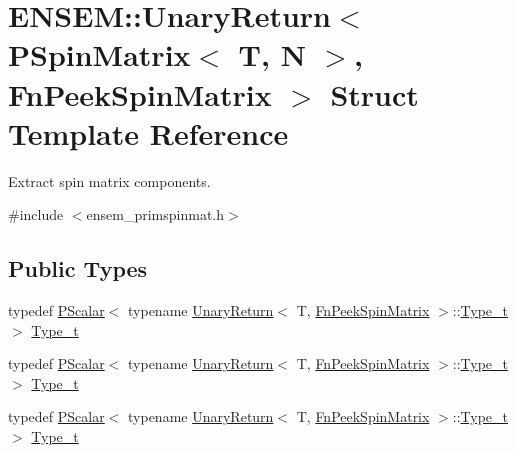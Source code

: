 \hypertarget{structENSEM_1_1UnaryReturn_3_01PSpinMatrix_3_01T_00_01N_01_4_00_01FnPeekSpinMatrix_01_4}{}\section{E\+N\+S\+EM\+:\+:Unary\+Return$<$ P\+Spin\+Matrix$<$ T, N $>$, Fn\+Peek\+Spin\+Matrix $>$ Struct Template Reference}
\label{structENSEM_1_1UnaryReturn_3_01PSpinMatrix_3_01T_00_01N_01_4_00_01FnPeekSpinMatrix_01_4}


Extract spin matrix components.  




{\ttfamily \#include $<$ensem\+\_\+primspinmat.\+h$>$}

\subsection*{Public Types}
\begin{DoxyCompactItemize}
\item 
typedef \mbox{\hyperlink{classENSEM_1_1PScalar}{P\+Scalar}}$<$ typename \mbox{\hyperlink{structENSEM_1_1UnaryReturn}{Unary\+Return}}$<$ T, \mbox{\hyperlink{structENSEM_1_1FnPeekSpinMatrix}{Fn\+Peek\+Spin\+Matrix}} $>$\+::\mbox{\hyperlink{structENSEM_1_1UnaryReturn_3_01PSpinMatrix_3_01T_00_01N_01_4_00_01FnPeekSpinMatrix_01_4_a1a718fe587d03e5619b75af54e2a19a3}{Type\+\_\+t}} $>$ \mbox{\hyperlink{structENSEM_1_1UnaryReturn_3_01PSpinMatrix_3_01T_00_01N_01_4_00_01FnPeekSpinMatrix_01_4_a1a718fe587d03e5619b75af54e2a19a3}{Type\+\_\+t}}
\item 
typedef \mbox{\hyperlink{classENSEM_1_1PScalar}{P\+Scalar}}$<$ typename \mbox{\hyperlink{structENSEM_1_1UnaryReturn}{Unary\+Return}}$<$ T, \mbox{\hyperlink{structENSEM_1_1FnPeekSpinMatrix}{Fn\+Peek\+Spin\+Matrix}} $>$\+::\mbox{\hyperlink{structENSEM_1_1UnaryReturn_3_01PSpinMatrix_3_01T_00_01N_01_4_00_01FnPeekSpinMatrix_01_4_a1a718fe587d03e5619b75af54e2a19a3}{Type\+\_\+t}} $>$ \mbox{\hyperlink{structENSEM_1_1UnaryReturn_3_01PSpinMatrix_3_01T_00_01N_01_4_00_01FnPeekSpinMatrix_01_4_a1a718fe587d03e5619b75af54e2a19a3}{Type\+\_\+t}}
\item 
typedef \mbox{\hyperlink{classENSEM_1_1PScalar}{P\+Scalar}}$<$ typename \mbox{\hyperlink{structENSEM_1_1UnaryReturn}{Unary\+Return}}$<$ T, \mbox{\hyperlink{structENSEM_1_1FnPeekSpinMatrix}{Fn\+Peek\+Spin\+Matrix}} $>$\+::\mbox{\hyperlink{structENSEM_1_1UnaryReturn_3_01PSpinMatrix_3_01T_00_01N_01_4_00_01FnPeekSpinMatrix_01_4_a1a718fe587d03e5619b75af54e2a19a3}{Type\+\_\+t}} $>$ \mbox{\hyperlink{structENSEM_1_1UnaryReturn_3_01PSpinMatrix_3_01T_00_01N_01_4_00_01FnPeekSpinMatrix_01_4_a1a718fe587d03e5619b75af54e2a19a3}{Type\+\_\+t}}
\end{DoxyCompactItemize}


